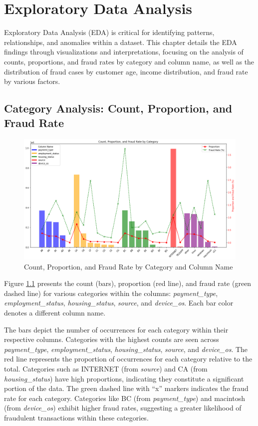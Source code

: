 \documentclass[12pt,a4paper]{report}
\begin{document}
\chapter{Exploratory Data Analysis}

Exploratory Data Analysis (EDA) is critical for identifying patterns, relationships, and anomalies within a dataset. This chapter details the EDA findings through visualizations and interpretations, focusing on the analysis of counts, proportions, and fraud rates by category and column name, as well as the distribution of fraud cases by customer age, income distribution, and fraud rate by various factors.

\section{Category Analysis: Count, Proportion, and Fraud Rate}

\begin{figure}[h]
    \centering
    \includegraphics[width=\textwidth]{Count_Proportion_and_Fraud_Rate_by_Category.png}
    \caption{Count, Proportion, and Fraud Rate by Category and Column Name}
    \label{fig:count_proportion_fraud_rate}
\end{figure}

Figure \ref{fig:count_proportion_fraud_rate} presents the count (bars), proportion (red line), and fraud rate (green dashed line) for various categories within the columns: \textit{payment\_type}, \textit{employment\_status}, \textit{housing\_status}, \textit{source}, and \textit{device\_os}. Each bar color denotes a different column name.

The bars depict the number of occurrences for each category within their respective columns. Categories with the highest counts are seen across \textit{payment\_type}, \textit{employment\_status}, \textit{housing\_status}, \textit{source}, and \textit{device\_os}. The red line represents the proportion of occurrences for each category relative to the total. Categories such as INTERNET (from \textit{source}) and CA (from \textit{housing\_status}) have high proportions, indicating they constitute a significant portion of the data. The green dashed line with ``x'' markers indicates the fraud rate for each category. Categories like BC (from \textit{payment\_type}) and macintosh (from \textit{device\_os}) exhibit higher fraud rates, suggesting a greater likelihood of fraudulent transactions within these categories.
\end{document}
